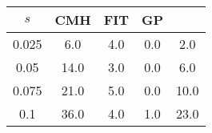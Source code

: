 \centering \begin{tabular}{c|c|c|c|c}
$s$	&CMH	&FIT	&GP	&\sc{Clear}\\\hline
0.025	&6.0	&4.0	&0.0	&2.0\\
0.05	&14.0	&3.0	&0.0	&6.0\\
0.075	&21.0	&5.0	&0.0	&10.0\\
0.1	&36.0	&4.0	&1.0	&23.0\\
\end{tabular}
